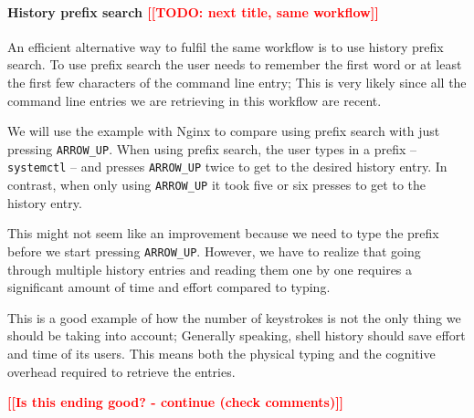 \documentclass[thesis=M,english]{FITthesis}[2012/10/20]
\newcommand{\todotext}[1]{\textcolor{red}{\textbf{[[#1]]}}}
\newcommand{\redtext}[1]{\textcolor{red}{[[#1]]}}
\begin{document}

\paragraph{History prefix search \redtext{TODO: next title, same workflow}}

An efficient alternative way to fulfil the same workflow is to use history prefix search. To use prefix search the user needs to remember the first word or at least the first few characters of the command line entry; This is very likely since all the command line entries we are retrieving in this workflow are recent.

We will use the example with Nginx to compare using prefix search with just pressing \verb|ARROW_UP|. When using prefix search, the user types in a prefix -- \verb|systemctl| -- and presses \verb|ARROW_UP| twice to get to the desired history entry. In contrast, when only using \verb|ARROW_UP| it took five or six presses to get to the history entry.

This might not seem like an improvement because we need to type the prefix before we start pressing \verb|ARROW_UP|. However, we have to realize that going through multiple history entries and reading them one by one requires a significant amount of time and effort compared to typing. 
    
This is a good example of how the number of keystrokes is not the only thing we should be taking into account; Generally speaking, shell history should save effort and time of its users. This means both the physical typing and the cognitive overhead required to retrieve the entries.


\todotext{Is this ending good? - continue (check comments)}

\end{document}
